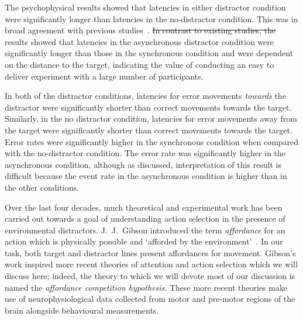 \documentclass[10pt,letterpaper]{article}
\providecommand{\DIFaddtex}[1]{{\protect\color{blue}\uwave{#1}}} %
\providecommand{\DIFdeltex}[1]{{\protect\color{red}\sout{#1}}}                      %
\providecommand{\DIFaddbegin}{} %
\providecommand{\DIFaddend}{} %
\providecommand{\DIFdelbegin}{} %
\providecommand{\DIFdelend}{} %
\providecommand{\DIFadd}[1]{\texorpdfstring{\DIFaddtex{#1}}{#1}} %
\providecommand{\DIFdel}[1]{\texorpdfstring{\DIFdeltex{#1}}{}} %
\begin{document}


The psychophysical results showed that latencies in either distractor
condition were significantly longer than latencies in the
no-distractor condition. This was in broad agreement with previous
studies~\cite{tipper_selective_1992,meegan_visual_1999,pratt_action-centered_1994}.
\DIFdelbegin \DIFdel{In contrast to existing studies, the }\DIFdelend \DIFaddbegin \DIFadd{The }\DIFaddend results showed that latencies in
the asynchronous distractor condition were \DIFaddbegin \DIFadd{slightly, but }\DIFaddend significantly longer than
those in the synchronous condition and were dependent on the distance
to the target, indicating the value of conducting an easy to deliver
experiment with a large number of participants.

In both of the distractor conditions, latencies for error movements
\emph{towards} the distractor were significantly shorter than correct
movements towards the target. Similarly, in the no distractor
condition, latencies for error movements away from the target were
significantly shorter than correct movements towards the target. Error
rates were significantly higher in the synchronous condition when
compared with the no-distractor condition. The error rate was
significantly higher in the asynchronous condition, although as
discussed, interpretation of this result is difficult because the
event rate in the asynchronous condition is higher than in the other
conditions.

Over the last four decades, much theoretical and experimental work has
been carried out towards a goal of understanding action selection in
the presence of environmental distractors. J.~J.~Gibson introduced the
term \emph{affordance} for an action which is physically possible and
`afforded by the environment'~\cite{gibson_ecological_1979}. In our
task, both target and distractor lines present affordances for
movement. Gibson's work inspired more recent theories of attention and
action selection which we will discuss here; indeed, the theory to
which we will devote most of our discussion is named the
\emph{affordance competition hypothesis}. These more recent theories
make use of neurophysiological data collected from motor and pre-motor
regions of the brain alongside behavioural measurements.
\end{document}
